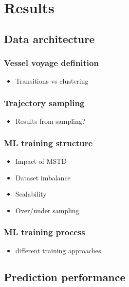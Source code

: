 \chapter{Results}
\label{chap:results}

\section{Data architecture}

\subsection{Vessel voyage definition}

\begin{itemize}
    \item Transitions vs clustering
\end{itemize}

\subsection{Trajectory sampling}

\begin{itemize}
    \item Results from sampling?
\end{itemize}

\subsection{ML training structure}

\begin{itemize}
    \item Impact of MSTD
    \item Dataset imbalance
    \item Scalability
    \item Over/under sampling
\end{itemize}

\subsection{ML training process}

\begin{itemize}
    \item different training approaches
\end{itemize}

\section{Prediction performance}

